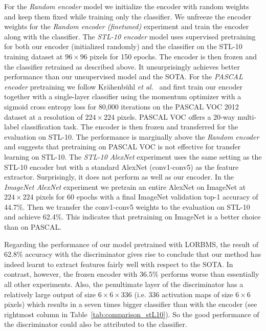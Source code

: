 \documentclass[a4paper,12pt]{report}
\begin{document}
For the \textit{Random encoder} model we initialize the encoder with random weights and keep them fixed while training only the classifier. We unfreeze the encoder weights for the \textit{Random encoder (finetuned)} experiment and train the encoder along with the classifier. The \textit{STL-10 encoder} model uses supervised pretraining for both our encoder (initialized randomly) and the classifier on the STL-10 training dataset at $96 \times 96$ pixels for 150 epochs. The encoder is then frozen and the classifier retrained as described above. It unsurprisingly achieves better performance than our unsupervised model and the SOTA. For the \textit{PASCAL encoder} pretraining we follow Krähenbühl \textit{et al.}~\cite{PascalVocTraining} and first train our encoder together with a single-layer classifier using the momentum optimizer with a sigmoid cross entropy loss for 80,000 iterations on the PASCAL VOC 2012 dataset at a resolution of $224 \times 224$ pixels. PASCAL VOC offers a 20-way multi-label classification task. The encoder is then frozen and transferred for the evaluation on STL-10. The performance is marginally above the \textit{Random encoder} and suggests that pretraining on PASCAL VOC is not effective for transfer learning on STL-10. The \textit{STL-10 AlexNet} experiment uses the same setting as the STL-10 encoder but with a standard AlexNet (conv1-conv5) as the feature extractor. Surprisingly, it does not perform as well as our encoder. In the \textit{ImageNet AlexNet} experiment we pretrain an entire AlexNet on ImageNet at $224 \times 224$ pixels for 60 epochs with a final ImageNet validation top-1 accuracy of 44.7\%. Then we transfer the conv1-conv5 weights to the evaluation on STL-10 and achieve 62.4\%. This indicates that pretraining on ImageNet is a better choice than on PASCAL.

Regarding the performance of our model pretrained with LORBMS, the result of 62.8\% accuracy with the discriminator gives rise to conclude that our method has indeed learnt to extract features fairly well with respect to the SOTA. In contrast, however, the frozen encoder with 36.5\% performs worse than essentially all other experiments. Also, the penultimate layer of the discriminator has a relatively large output of size $6 \times 6 \times 336$ (i.e. 336 activation maps of size $6 \times 6$ pixels) which results in a seven times bigger classifier than with the encoder (see rightmost column in Table~\ref{tab:comparison_stL10}). So the good performance of the discriminator could also be attributed to the classifier.
\end{document}
